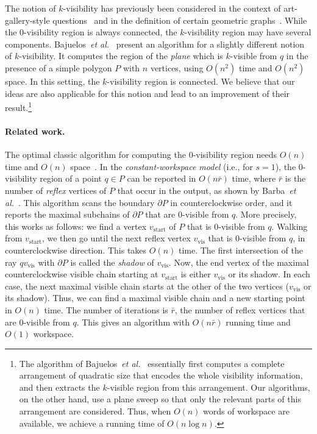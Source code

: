 \documentclass[11pt, a4paper]{article}
\newcommand{\etal}{\emph{et al.}\xspace}
\begin{document}
The notion of $k$-visibility has previously been considered
in the context of art-gallery-style questions~\cite{ballinger2013coverage,eppstein2007guard,
fulek2009intersecting,
o2012computational} and in the definition
of certain geometric graphs~\cite{dean2005bar,
felsner2008parameters,hartke2007further}.
While the $0$-visibility region is always connected,
the $k$-visibility region may have several components.
Bajuelos~\etal~\cite{bajuelos2012hybrid} present an 
algorithm for a slightly different notion of 
$k$-visibility. It computes the region of the \emph{plane} 
which is $k$-visible from $q$ in the presence of a 
simple polygon $P$ with $n$ vertices, using $O(n^{2})$ 
time and $O(n^2)$ space. In this setting, the 
$k$-visibility region is connected. We believe that our 
ideas are also applicable for this notion and lead to an
improvement of their result.\footnote{The algorithm of 
Bajuelos~\etal~\cite{bajuelos2012hybrid} essentially first computes  
a complete arrangement of quadratic size that encodes the whole 
visibility information, and then extracts the $k$-visible region from 
this arrangement. Our algorithms, on the other hand, use a 
plane sweep so that only the relevant parts of this arrangement are 
considered. Thus, when $O(n)$ words of workspace are available, 
we achieve a running time of $O(n \log n)$.}

\paragraph{Related work.}
The optimal classic algorithm for computing the 
$0$-visibility region needs $O(n)$ time and $O(n)$ 
space~\cite{joe1987corrections}. In the 
\emph{constant-workspace model} (i.e., for $s = 1$), the
$0$-visibility region of a point $q \in P$ can
be reported in $O(n\bar{r})$ time, where 
$\bar{r}$ is the number of \emph{reflex} vertices 
of $P$ that occur in the output,
as shown by Barba~\etal~\cite{barba2014computing}.
This algorithm scans the boundary $\partial P$
in counterclockwise order, and it reports the 
maximal subchains of $\partial P$ that are 
$0$-visible from $q$. More precisely, this 
works as follows: we find a vertex
$v_\text{start}$ of $P$ that is $0$-visible 
from $q$. Walking from $v_\text{start}$, we 
then go until the next reflex vertex
$v_\text{vis}$ that is $0$-visible from $q$,
in counterclockwise direction.
This takes $O(n)$ time. The first intersection 
of the ray $qv_\text{vis}$ with $\partial P$ is 
called the \emph{shadow} of $v_\text{vis}$. 
Now, the end vertex of the maximal counterclockwise 
visible chain starting at $v_\text{start}$ is either 
$v_\text{vis}$ or its shadow. In each case, 
the next maximal visible chain starts at the other
of the two vertices ($v_\text{vis}$ or its shadow). Thus, we  can
find a maximal visible chain and a new starting 
point in $O(n)$ time. 
The number of iterations is $\bar{r}$, the number 
of reflex vertices that are $0$-visible from $q$.
This gives an algorithm with $O(n\bar{r})$ running 
time and $O(1)$ workspace. 
\end{document}
